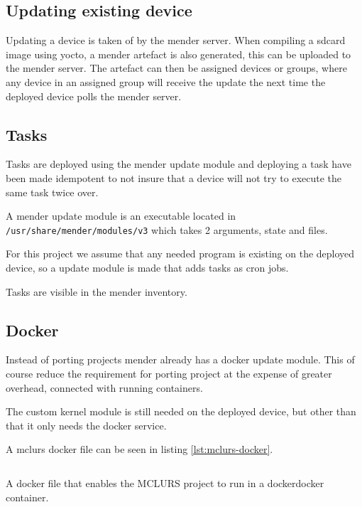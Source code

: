 \documentclass[../../main.tex]{subfiles}
\begin{document}
\subsection{Updating existing device}%
\label{sub:updating_existing_device}

Updating a device is taken of by the mender server. When compiling a sdcard image using yocto,
a mender artefact is also generated, this can be uploaded to the mender server.
The artefact can then be assigned devices or groups, where any device in an assigned group will
receive the update the next time the deployed device polls the mender server.



\subsection{Tasks}%
\label{sub:tasks}

Tasks are deployed using the mender update module and deploying a task have been made idempotent
to not insure that a device will not try to execute the same task twice over.

A mender update module is an executable located in \texttt{/usr/share/mender/modules/v3}
which takes 2 arguments, state and files.

For this project we assume that any needed program is existing on the deployed device,
so a update module is made that adds tasks as cron jobs.

Tasks are visible in the mender inventory.

\subsection{Docker}%
\label{sub:docker}

Instead of porting projects mender already has a docker update module. This of course reduce
the requirement for porting project at the expense of greater overhead, connected with running
containers.

The custom kernel module is still needed on the deployed device, but other than that it only needs
the docker service.

A mclurs docker file can be seen in listing \ref{lst:mclurs-docker}.

\begin{listing}[h]
\inputminted{docker}{/home/aske/Bachelor/DockerMCLURS/Dockerfile}
\caption{A docker file that enables the MCLURS project to run in a dockerdocker  container.}
\label{lst:mclurs-docker}
\end{listing}
\end{document}
